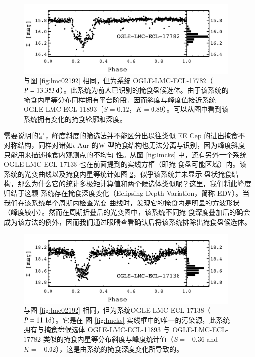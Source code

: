 \begin{figure}[t]
\centering
\includegraphics[width=0.98\textwidth,trim={0.0in 0.2in 0 0}]{figures/chapter3/f9_lmc11782.pdf}
\caption[与图 \ref{fig:lmc02192} 相同，但为系统 OGLE-LMC-ECL-17782（$P=13.353\,\tif{d}$）。此系统为前人已识别的掩食盘候选体。由于该系统的掩食内星等分布同样拥有平台阶段，因而斜度与峰度值接近系统 OGLE-LMC-ECL-11893（$S=0.12$，$K=0.89$）。可以从图中看到该系统拥有变化的掩食轮廓和深度。]{与图 \ref{fig:lmc02192} 相同，但为系统 OGLE-LMC-ECL-17782（$P=13.353\,\tif{d}$）。此系统为前人已识别的掩食盘候选体\cite{Graczyk2011}。由于该系统的掩食内星等分布同样拥有平台阶段，因而斜度与峰度值接近系统 OGLE-LMC-ECL-11893（$S=0.12$，$K=0.89$）。可以从图中看到该系统拥有变化的掩食轮廓和深度。}
\label{fig:lmc11782}
\end{figure}


需要说明的是，峰度斜度的筛选法并不能区分出以往类似 EE Cep 的进出掩食不对称结构，同样对诸如$
\epsilon$ Aur 的W 型掩食结构也无法分离与识别，因为峰度斜度只能用来描述掩食内观测点的不均匀
性。从图 \ref{fig:lmcks} 中，还有另外一个系统 OGLE-LMC-ECL-17138 也在前面提到的实线方框（即掩
食盘可能区域）内。该系统的光变曲线以及掩食内星等统计如图 \ref{fig:lmc17138}，似乎该系统并未显示
盘状掩食结构，那么为什么它的统计多极矩计算值和两个候选体类似呢？这里，我们将此峰度归结于这颗
系统存在掩食深度变化（Eclipsing Depth Variation，简称 EDV）。当我们在该系统单个周期内检查光变
曲线时，发现它的掩食内是明显的方波形状（峰度较小）。然而在周期折叠后的光变图中，该系统不同掩
食深度叠加后的确会成为该方法的例外，因而我们通过眼睛查看确认后将该系统排除出掩食盘候选体。

\begin{figure}[t]
\centering
\includegraphics[width=0.98\textwidth,trim={0.0in 0.2in 0 0}]{figures/chapter3/f10_lmc17138.pdf}
\caption{与图 \ref{fig:lmc02192} 相同，但为系统OGLE-LMC-ECL-17138（$P = 11.1 \mathrm{d}$）。它是在 图 \ref{fig:lmcks} 实线框中的唯一的污染源。此系统拥有与掩食盘候选体 OGLE-LMC-ECL-11893 与 OGLE-LMC-ECL-17782 类似的掩食内星等分布斜度与峰度统计值（$S=-0.36$ and $K=-0.02$），这是由系统的掩食深度变化所导致的。}
\label{fig:lmc17138}
\end{figure}



